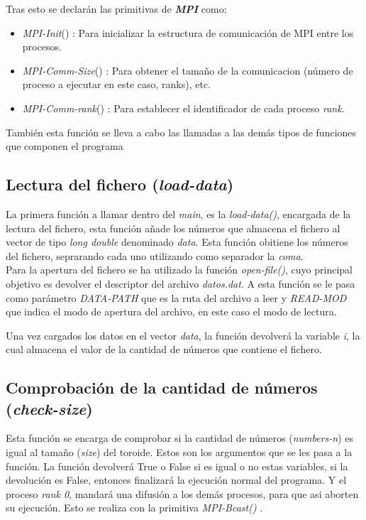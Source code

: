 \documentclass[11pt]{article}
\begin{document}
Tras esto se declarán las primitivas de \textit{\textbf{MPI}} como: 
\begin{itemize}
	\item \textit{MPI-Init}() \cite{mpi_init}: Para inicializar la estructura de comunicación de MPI entre los procesos. 
	\item \textit{MPI-Comm-Size}() \cite{mpi_size}: Para obtener el tamaño de la comunicacion (número de proceso a ejecutar en este caso, ranks), etc.
	\item \textit{MPI-Comm-rank}() \cite{mpi_rank}: Para establecer el identificador de cada proceso \textit{rank}.
\end{itemize}

También esta función se lleva a cabo las llamadas a las demás tipos de funciones que componen el programa



\subsection{Lectura del fichero (\textit{load-data})}
La primera función a llamar dentro del \textit{main}, es la \textit{load-data()}, encargada de la lectura del fichero, esta función añade los números que almacena el fichero al vector de tipo \textit{long double} denominado \textit{data}.
Esta función obitiene los números del fichero, seprarando cada uno utilizando como separador la \textit{coma}.\\

Para la apertura del fichero se ha utilizado la función \textit{open-file()}, cuyo principal objetivo es devolver el descriptor del archivo \textit{datos.dat}.
A esta función se le pasa como parámetro \textit{DATA-PATH} que es la ruta del archivo a leer y \textit{READ-MOD} que indica el modo de apertura del archivo, en este caso el modo de lectura.


Una vez cargados los datos en el vector \textit{data}, la función devolverá la variable \textit{i}, la cual almacena el valor de la cantidad de números que contiene el fichero.


\subsection{Comprobación de la cantidad de números (\textit{check-size})}
Esta función se encarga de comprobar si la cantidad de números (\textit{numbers-n}) es igual al tamaño (\textit{size}) \cite{mpi_size} del toroide. Estos son los argumentos que se les pasa a la función.
La función devolverá True o False si es igual o no estas variables, si la devolución es False, entonces finalizará la ejecución normal del programa. Y el proceso \textit{rank 0}, mandará una difusión a los demás procesos, para que asi aborten su ejecución. Esto se realiza con la primitiva \textit{MPI-Bcast()} \citep{mpi_bcast}. 
\end{document}
